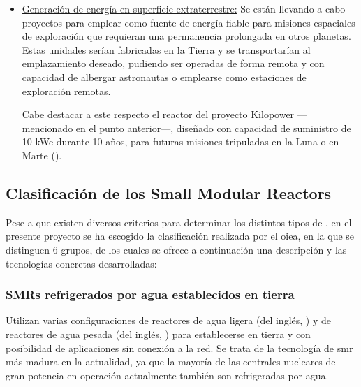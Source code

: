 \begin{itemize}
  \item \underline{Generación de energía en superficie extraterrestre:} Se están llevando a cabo proyectos para emplear  como fuente de energía fiable para misiones espaciales de exploración que requieran una permanencia prolongada en otros planetas. Estas unidades serían fabricadas en la Tierra y se transportarían al emplazamiento deseado, pudiendo ser operadas de forma remota y con capacidad de albergar astronautas o emplearse como estaciones de exploración remotas.
  
  Cabe destacar a este respecto el reactor del proyecto Kilopower ---mencionado en el punto anterior---, diseñado con capacidad de suministro de 10 kWe durante 10 años, para futuras misiones tripuladas en la Luna o en Marte (\cite{nasa_fission_surface_power}).
  
\end{itemize}

\subsection{Clasificación de los Small Modular Reactors}

Pese a que existen diversos criterios para determinar los distintos tipos de , en el presente proyecto se ha escogido la clasificación realizada por el \acrshort{oiea}, en la que se distinguen 6 grupos, de los cuales se ofrece a continuación una descripción y las tecnologías concretas desarrolladas:

\subsubsection{SMRs refrigerados por agua establecidos en tierra}

 Utilizan varias configuraciones de reactores de agua ligera (del inglés, ) y de reactores de agua pesada (del inglés, ) para establecerse en tierra y con posibilidad de aplicaciones sin conexión a la red. Se trata de la tecnología de \acrshort{smr} más madura en la actualidad, ya que la mayoría de las centrales nucleares de gran potencia en operación actualmente también son refrigeradas por agua.

